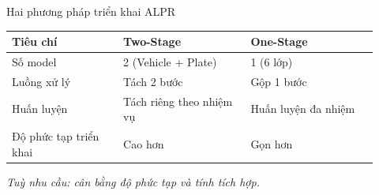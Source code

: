 \begin{frame}{Hai phương pháp triển khai ALPR}
    \begin{table}
        \centering
        \begin{tabular}{p{0.28\linewidth} p{0.32\linewidth} p{0.32\linewidth}}
            \toprule
            \textbf{Tiêu chí} & \textbf{Two-Stage} & \textbf{One-Stage} \\
            \midrule
            Số model & 2 (Vehicle + Plate) & 1 (6 lớp) \\
            Luồng xử lý & Tách 2 bước & Gộp 1 bước \\
            Huấn luyện & Tách riêng theo nhiệm vụ & Huấn luyện đa nhiệm \\
            Độ phức tạp triển khai & Cao hơn & Gọn hơn \\
            \bottomrule
        \end{tabular}
    \end{table}

    \textit{Tuỳ nhu cầu: cân bằng độ phức tạp và tính tích hợp.}
\end{frame}
